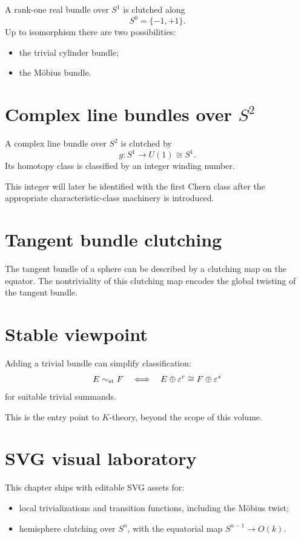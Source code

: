 A rank-one real bundle over \(S^1\) is clutched along
\[
S^0=\{-1,+1\}.
\]
Up to isomorphism there are two possibilities:
\begin{itemize}
\item the trivial cylinder bundle;
\item the Möbius bundle.
\end{itemize}

\section{Complex line bundles over \(S^2\)}

A complex line bundle over \(S^2\) is clutched by
\[
g:S^1\to U(1)\cong S^1.
\]
Its homotopy class is classified by an integer winding number.

This integer will later be identified with the first Chern class after the
appropriate characteristic-class machinery is introduced.

\section{Tangent bundle clutching}

The tangent bundle of a sphere can be described by a clutching map on the
equator.  The nontriviality of this clutching map encodes the global twisting
of the tangent bundle.

\section{Stable viewpoint}

Adding a trivial bundle can simplify classification:
\[
E\sim_{\rm st}F
\quad\Longleftrightarrow\quad
E\oplus\varepsilon^r\cong F\oplus\varepsilon^s
\]
for suitable trivial summands.

This is the entry point to \(K\)-theory, beyond the scope of this volume.

\section{SVG visual laboratory}

This chapter ships with editable SVG assets for:
\begin{itemize}
\item local trivializations and transition functions, including the Möbius
twist;
\item hemisphere clutching over \(S^n\), with the equatorial map
\(S^{n-1}\to O(k)\).
\end{itemize}

